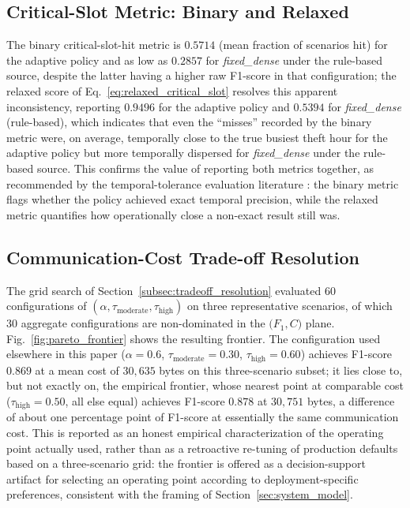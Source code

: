 \documentclass{ieeeaccess}
\begin{document}
\subsection{Critical-Slot Metric: Binary and Relaxed}
The binary critical-slot-hit metric is $0.5714$ (mean fraction of scenarios hit) for the adaptive policy and as low as $0.2857$ for \textit{fixed\_dense} under the rule-based source, despite the latter having a higher raw F1-score in that configuration; the relaxed score of Eq.~\eqref{eq:relaxed_critical_slot} resolves this apparent inconsistency, reporting $0.9496$ for the adaptive policy and $0.5394$ for \textit{fixed\_dense} (rule-based), which indicates that even the ``misses'' recorded by the binary metric were, on average, temporally close to the true busiest theft hour for the adaptive policy but more temporally dispersed for \textit{fixed\_dense} under the rule-based source. This confirms the value of reporting both metrics together, as recommended by the temporal-tolerance evaluation literature \cite{b36,b37}: the binary metric flags whether the policy achieved exact temporal precision, while the relaxed metric quantifies how operationally close a non-exact result still was.

\subsection{Communication-Cost Trade-off Resolution}
\label{subsec:results_pareto}
The grid search of Section~\ref{subsec:tradeoff_resolution} evaluated 60 configurations of $(\alpha, \tau_{\text{moderate}}, \tau_{\text{high}})$ on three representative scenarios, of which 30 aggregate configurations are non-dominated in the $\bigl(F_1, C\bigr)$ plane. Fig.~\ref{fig:pareto_frontier} shows the resulting frontier. The configuration used elsewhere in this paper ($\alpha = 0.6$, $\tau_{\text{moderate}} = 0.30$, $\tau_{\text{high}} = 0.60$) achieves F1-score $0.869$ at a mean cost of $30{,}635$ bytes on this three-scenario subset; it lies close to, but not exactly on, the empirical frontier, whose nearest point at comparable cost ($\tau_{\text{high}} = 0.50$, all else equal) achieves F1-score $0.878$ at $30{,}751$ bytes, a difference of about one percentage point of F1-score at essentially the same communication cost. This is reported as an honest empirical characterization of the operating point actually used, rather than as a retroactive re-tuning of production defaults based on a three-scenario grid: the frontier is offered as a decision-support artifact for selecting an operating point according to deployment-specific preferences, consistent with the framing of Section~\ref{sec:system_model}.
\end{document}
